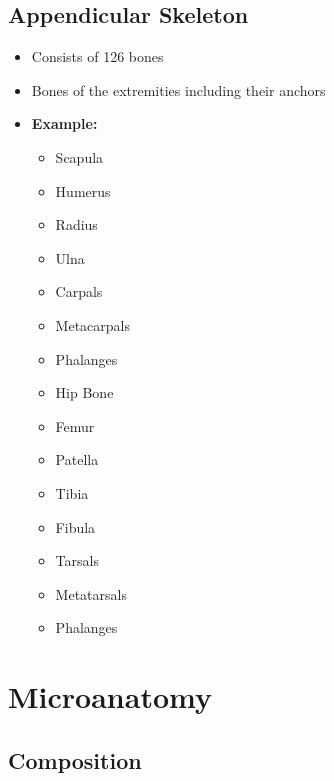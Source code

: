 \documentclass[11pt]{article}
\begin{document}
\subsection{Appendicular Skeleton}
\begin{itemize}
    \item Consists of 126 bones
    \item Bones of the extremities including their anchors
    \item \textbf{Example:}
    \begin{itemize}
        \item Scapula
        \item Humerus
        \item Radius
        \item Ulna
        \item Carpals
        \item Metacarpals
        \item Phalanges
        \item Hip Bone
        \item Femur
        \item Patella
        \item Tibia
        \item Fibula
        \item Tarsals
        \item Metatarsals
        \item Phalanges
    \end{itemize}
\end{itemize}

\section{Microanatomy}

\subsection{Composition}
\end{document}
